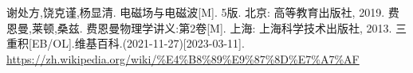 \begin{thebibliography}{99}%
     谢处方,饶克谨,杨显清. 电磁场与电磁波[M]. 5版. 北京: 高等教育出版社, 2019.
     费恩曼,莱顿,桑兹. 费恩曼物理学讲义:第2卷[M]. 上海: 上海科学技术出版社, 2013.
     三重积[EB/OL].维基百科.(2021-11-27)[2023-03-11].\\\url{https://zh.wikipedia.org/wiki/%E4%B8%89%E9%87%8D%E7%A7%AF}
\end{thebibliography}
